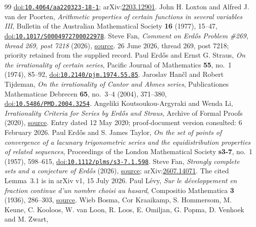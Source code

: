 \begin{thebibliography}{99}
  \href{https://doi.org/10.4064/aa220323-18-1}{doi:\nolinkurl{10.4064/aa220323-18-1}}; arXiv:\href{https://arxiv.org/abs/2203.12901}{2203.12901}.
 John H. Loxton and Alfred J. van der Poorten,
  \emph{Arithmetic properties of certain functions in several variables III}, Bulletin of the Australian Mathematical Society \textbf{16} (1977), 15--47,
  \href{https://doi.org/10.1017/S0004972700022978}{doi:\nolinkurl{10.1017/S0004972700022978}}.
 Steve Fan,
  \emph{Comment on Erd\H{o}s Problem \#269, thread 269, post 7218} (2026),
  \href{https://www.erdosproblems.com/forum/thread/269#post-7218}{source}. 26 June 2026, thread 269, post 7218; priority retained from the supplied record.
 Paul Erd\H{o}s and Ernst G. Straus,
  \emph{On the irrationality of certain series}, Pacific Journal of Mathematics \textbf{55}, no.~1 (1974), 85--92,
  \href{https://doi.org/10.2140/pjm.1974.55.85}{doi:\nolinkurl{10.2140/pjm.1974.55.85}}.
 Jaroslav Han\v{c}l and Robert Tijdeman,
  \emph{On the irrationality of Cantor and Ahmes series}, Publicationes Mathematicae Debrecen \textbf{65}, no.~3--4 (2004), 371--380,
  \href{https://doi.org/10.5486/PMD.2004.3254}{doi:\nolinkurl{10.5486/PMD.2004.3254}}.
 Angeliki Koutsoukou-Argyraki and Wenda Li,
  \emph{Irrationality Criteria for Series by Erd\H{o}s and Straus}, Archive of Formal Proofs (2020),
  \href{https://isa-afp.org/entries/Irrational_Series_Erdos_Straus.html}{source}. Entry dated 12 May 2020; proof-document version consulted: 6 February 2026.
 Paul Erd\H{o}s and S. James Taylor,
  \emph{On the set of points of convergence of a lacunary trigonometric series and the equidistribution properties of related sequences}, Proceedings of the London Mathematical Society \textbf{s3-7}, no.~1 (1957), 598--615,
  \href{https://doi.org/10.1112/plms/s3-7.1.598}{doi:\nolinkurl{10.1112/plms/s3-7.1.598}}.
 Steve Fan,
  \emph{Strongly complete sets and a conjecture of Erd\H{o}s} (2026),
  \href{https://arxiv.org/abs/2607.14071v1}{source}; arXiv:\href{https://arxiv.org/abs/2607.14071}{2607.14071}. The cited Lemma~3.1 is in arXiv v1, 15 July 2026.
 Paul L\'{e}vy,
  \emph{Sur le d\'{e}veloppement en fraction continue d'un nombre choisi au hasard}, Compositio Mathematica \textbf{3} (1936), 286--303,
  \href{https://www.numdam.org/item/CM_1936__3__286_0/}{source}.
 Wieb Bosma, Cor Kraaikamp, S. Hommersom, M. Keune, C. Kooloos, W. van Loon, R. Loos, E. Omiljan, G. Popma, D. Venhoek and M. Zwart,

\end{thebibliography}
